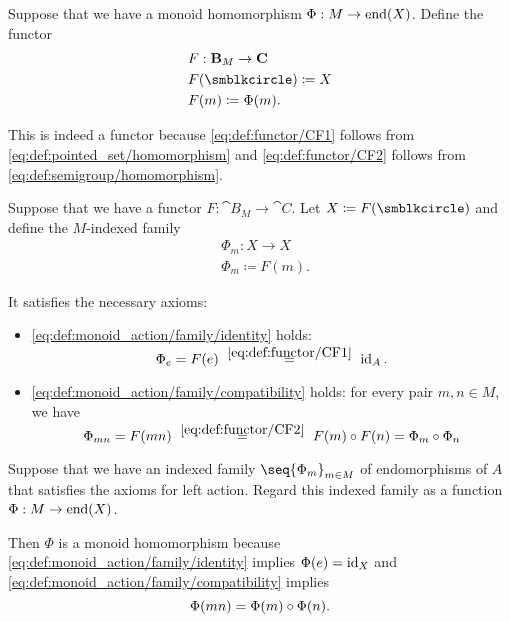 \begin{defproof}
   Suppose that we have a monoid homomorphism \( \Phi: M \to \operatorname{end}(X) \). Define the functor
  \begin{equation*}
    \begin{aligned}
      &F: \cat{B}_M \to \cat{C} \\
      &F(\anon) \coloneqq X \\
      &F(m) \coloneqq \Phi(m).
    \end{aligned}
  \end{equation*}

  This is indeed a functor because \eqref{eq:def:functor/CF1} follows from \eqref{eq:def:pointed_set/homomorphism} and \eqref{eq:def:functor/CF2} follows from \eqref{eq:def:semigroup/homomorphism}.

   Suppose that we have a functor \( F: \cat{B}_M \to \cat{C} \). Let \( X \coloneqq F(\anon) \) and define the \( M \)-indexed family
  \begin{equation*}
    \begin{aligned}
      &\Phi_m: X \to X \\
      &\Phi_m \coloneqq F(m).
    \end{aligned}
  \end{equation*}

  It satisfies the necessary axioms:
  \begin{itemize}
    \item \ref{eq:def:monoid_action/family/identity} holds:
    \begin{equation*}
      \Phi_e
      =
      F(e)
      \reloset {\eqref{eq:def:functor/CF1}} =
      \id_A.
    \end{equation*}

    \item \ref{eq:def:monoid_action/family/compatibility} holds: for every pair \( m, n \in M \), we have
    \begin{equation*}
      \Phi_{mn}
      =
      F(mn)
      \reloset {\eqref{eq:def:functor/CF2}} =
      F(m) \bincirc F(n)
      =
      \Phi_m \bincirc \Phi_n
    \end{equation*}
  \end{itemize}

   Suppose that we have an indexed family \( \seq{ \Phi_m }_{m \in M} \) of endomorphisms of \( A \) that satisfies the axioms for left action. Regard this indexed family as a function \( \Phi: M \to \operatorname{end}(X) \).

  Then \( \Phi \) is a monoid homomorphism because \ref{eq:def:monoid_action/family/identity} implies \( \Phi(e) = \operatorname{id}_X \) and \eqref{eq:def:monoid_action/family/compatibility} implies
  \begin{equation*}
    \Phi(mn) = \Phi(m) \bincirc \Phi(n).
  \end{equation*}
\end{defproof}

